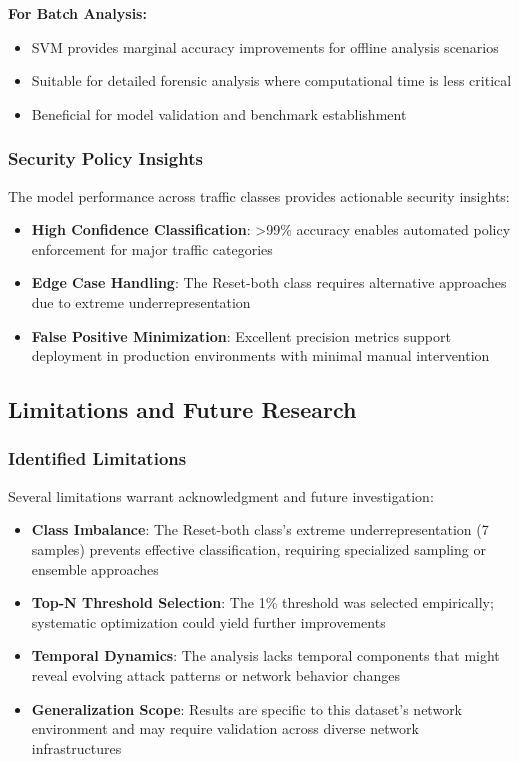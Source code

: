 \documentclass[12pt,a4paper]{article}
\begin{document}
\textbf{For Batch Analysis:}
\begin{itemize}
    \item SVM provides marginal accuracy improvements for offline analysis scenarios
    \item Suitable for detailed forensic analysis where computational time is less critical
    \item Beneficial for model validation and benchmark establishment
\end{itemize}

\subsubsection{Security Policy Insights}

The model performance across traffic classes provides actionable security insights:

\begin{itemize}
    \item \textbf{High Confidence Classification}: >99\% accuracy enables automated policy enforcement for major traffic categories
    \item \textbf{Edge Case Handling}: The Reset-both class requires alternative approaches due to extreme underrepresentation
    \item \textbf{False Positive Minimization}: Excellent precision metrics support deployment in production environments with minimal manual intervention
\end{itemize}

\subsection{Limitations and Future Research}

\subsubsection{Identified Limitations}

Several limitations warrant acknowledgment and future investigation:

\begin{itemize}
    \item \textbf{Class Imbalance}: The Reset-both class's extreme underrepresentation (7 samples) prevents effective classification, requiring specialized sampling or ensemble approaches
    \item \textbf{Top-N Threshold Selection}: The 1\% threshold was selected empirically; systematic optimization could yield further improvements
    \item \textbf{Temporal Dynamics}: The analysis lacks temporal components that might reveal evolving attack patterns or network behavior changes
    \item \textbf{Generalization Scope}: Results are specific to this dataset's network environment and may require validation across diverse network infrastructures
\end{itemize}
\end{document}
